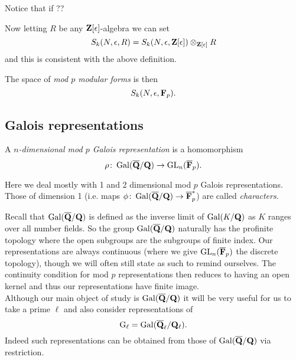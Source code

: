 \documentclass[a4paper,12pt]{article}
\begin{document}
\begin{ex}
\end{ex}

Notice that if ??

\begin{defn}
Now letting $R$ be any $\mathbf{Z}[\epsilon]$-algebra we can set
\[
S_k(N, \epsilon, R) = S_k(N, \epsilon, \mathbf{Z}[\epsilon]) \otimes_{\mathbf{Z}[\epsilon]} R
\]
and this is consistent with the above definition.

The space of \emph{mod $p$ modular forms} is then
\[
S_k(N, \epsilon, \mathbf{F}_p).
\]
\end{defn}



\subsection{Galois representations}
\begin{defn}
A \emph{$n$-dimensional mod $p$ Galois representation} is a homomorphism
\[
\rho\colon \operatorname{Gal}(\overline{\mathbf{Q}}/\mathbf{Q}) \to \operatorname{GL}_n(\overline{\mathbf{F}}_p).
\]
\end{defn}

Here we deal mostly with 1 and 2 dimensional mod $p$ Galois representations.
Those of dimension 1 (i.e. maps $\phi\colon\operatorname{Gal}(\overline{\mathbf{Q}}/\mathbf{Q}) \to \overline{\mathbf{F}}_p^*$) are called \emph{characters}.

Recall that $\operatorname{Gal}(\overline{\mathbf{Q}}/\mathbf{Q})$ is defined as the inverse limit of $\operatorname{Gal}(K/\mathbf{Q})$ as $K$ ranges over all number fields.
So the group $\operatorname{Gal}(\overline{\mathbf{Q}}/\mathbf{Q})$ naturally has the profinite topology where the open subgroups are the subgroups of finite index.
Our representations are always continuous (where we give $\operatorname{GL}_n(\overline{\mathbf{F}}_p)$ the discrete topology), though we will often still state as such to remind ourselves.
The continuity condition for mod $p$ representations then reduces to having an open kernel and thus our representations have finite image.\\

Although our main object of study is $\operatorname{Gal}(\overline{\mathbf{Q}}/\mathbf{Q})$ it will be very useful for us to take a prime $\ell$ and also consider representations of
\[
\mathrm{G}_\ell = \operatorname{Gal}(\overline{\mathbf{Q}}_\ell/\mathbf{Q}_\ell).
\]
Indeed such representations can be obtained from those of $\operatorname{Gal}(\overline{\mathbf{Q}}/\mathbf{Q})$ via restriction.
\end{document}
